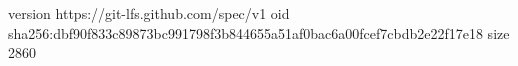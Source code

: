 version https://git-lfs.github.com/spec/v1
oid sha256:dbf90f833c89873bc991798f3b844655a51af0bac6a00fcef7cbdb2e22f17e18
size 2860

